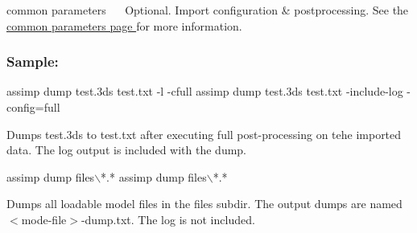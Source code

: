 {\ttfamily  common parameters~\newline
}~\newline
 Optional. Import configuration \& postprocessing. See the \hyperlink{common}{common parameters page } for more information. 





\subsubsection*{Sample\+:}


\begin{DoxyCode}
assimp dump test.3ds test.txt -l -cfull
assimp dump test.3ds test.txt -include-log -config=full
\end{DoxyCode}


Dumps \textquotesingle{}test.\+3ds\textquotesingle{} to \textquotesingle{}test.\+txt\textquotesingle{} after executing full post-\/processing on tehe imported data. The log output is included with the dump.


\begin{DoxyCode}
assimp dump files\(\backslash\)*.*
assimp dump files\(\backslash\)*.* 
\end{DoxyCode}


Dumps all loadable model files in the \textquotesingle{}files\textquotesingle{} subdir. The output dumps are named {\ttfamily $<$mode-\/file$>$-\/dump.\+txt}. The log is not included. 